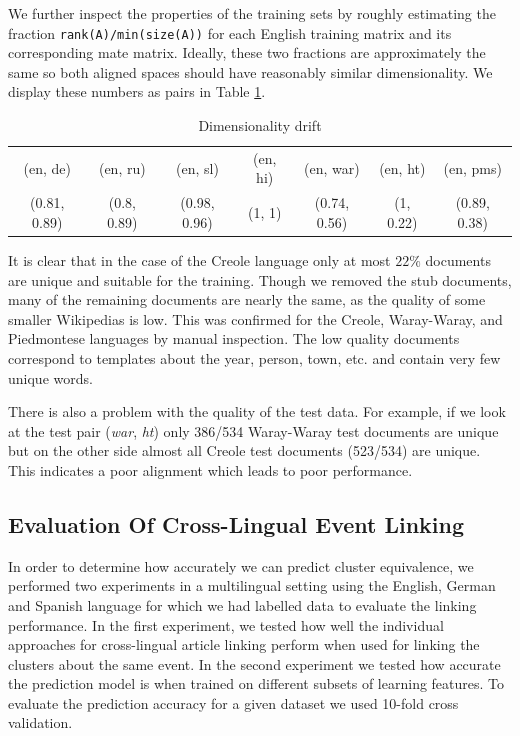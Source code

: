 \documentclass[twoside,11pt]{article}
\begin{document}
We further inspect the properties of the training sets by roughly estimating the fraction \texttt{rank(A)/min(size(A))} for each English training matrix and its corresponding mate matrix. Ideally, these two fractions are approximately the same so  both aligned spaces should have reasonably similar dimensionality. We display these numbers as pairs in Table \ref{table:rank}.

\begin{table}[h]
\caption{Dimensionality drift}
\label{table:rank}
\begin{tabular}{|c|c|c|c|c|c|c|}
\cline{1-7}
(en, de)     &   (en, ru)     &   (en, sl)       &     (en, hi)&   (en, war)      &      (en, ht) &   (en, pms)\\
\cline{1-7}
(0.81, 0.89)   &  (0.8, 0.89)  &   (0.98, 0.96)    &    (1, 1)  &   (0.74, 0.56)  &      (1, 0.22)  &   (0.89, 0.38)\\
\cline{1-7}
\end{tabular}
\end{table}

It is clear that in the case of the Creole language only at most $22\%$ documents are unique and suitable for the training. Though we removed the stub documents, many of the remaining documents are nearly the same, as the quality of some smaller Wikipedias is low. This was confirmed for the Creole, Waray-Waray, and Piedmontese languages by manual inspection. The low quality documents correspond to templates about the year, person, town, etc. and contain very few unique words.

There is also a problem with the quality of the test data. For example, if we look at the test pair (\emph{war}, \emph{ht}) only 386/534 Waray-Waray test documents are unique but on the other side almost all Creole test documents (523/534) are unique. This indicates a poor alignment which leads to poor performance.

\subsection{Evaluation Of Cross-Lingual Event Linking}
In order to determine how accurately we can predict cluster equivalence, we performed two experiments in a multilingual setting using the English, German and Spanish language for which we had labelled data to evaluate the linking performance. In the first experiment, we tested how well  the individual approaches for cross-lingual article linking perform when used for linking the clusters about the same event. In the second experiment we tested how accurate the prediction model is when trained on different subsets of learning features. To evaluate the prediction accuracy for a given dataset we used 10-fold cross validation.
\end{document}

